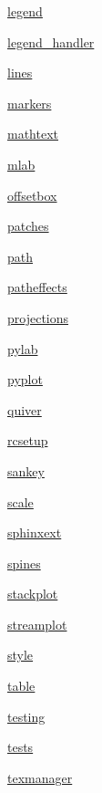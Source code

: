\begin{DoxyCompactItemize}
 \hyperlink{namespacematplotlib_1_1legend}{legend}
\item 
 \hyperlink{namespacematplotlib_1_1legend__handler}{legend\+\_\+handler}
\item 
 \hyperlink{namespacematplotlib_1_1lines}{lines}
\item 
 \hyperlink{namespacematplotlib_1_1markers}{markers}
\item 
 \hyperlink{namespacematplotlib_1_1mathtext}{mathtext}
\item 
 \hyperlink{namespacematplotlib_1_1mlab}{mlab}
\item 
 \hyperlink{namespacematplotlib_1_1offsetbox}{offsetbox}
\item 
 \hyperlink{namespacematplotlib_1_1patches}{patches}
\item 
 \hyperlink{namespacematplotlib_1_1path}{path}
\item 
 \hyperlink{namespacematplotlib_1_1patheffects}{patheffects}
\item 
 \hyperlink{namespacematplotlib_1_1projections}{projections}
\item 
 \hyperlink{namespacematplotlib_1_1pylab}{pylab}
\item 
 \hyperlink{namespacematplotlib_1_1pyplot}{pyplot}
\item 
 \hyperlink{namespacematplotlib_1_1quiver}{quiver}
\item 
 \hyperlink{namespacematplotlib_1_1rcsetup}{rcsetup}
\item 
 \hyperlink{namespacematplotlib_1_1sankey}{sankey}
\item 
 \hyperlink{namespacematplotlib_1_1scale}{scale}
\item 
 \hyperlink{namespacematplotlib_1_1sphinxext}{sphinxext}
\item 
 \hyperlink{namespacematplotlib_1_1spines}{spines}
\item 
 \hyperlink{namespacematplotlib_1_1stackplot}{stackplot}
\item 
 \hyperlink{namespacematplotlib_1_1streamplot}{streamplot}
\item 
 \hyperlink{namespacematplotlib_1_1style}{style}
\item 
 \hyperlink{namespacematplotlib_1_1table}{table}
\item 
 \hyperlink{namespacematplotlib_1_1testing}{testing}
\item 
 \hyperlink{namespacematplotlib_1_1tests}{tests}
\item 
 \hyperlink{namespacematplotlib_1_1texmanager}{texmanager}
\item 

\end{DoxyCompactItemize}
